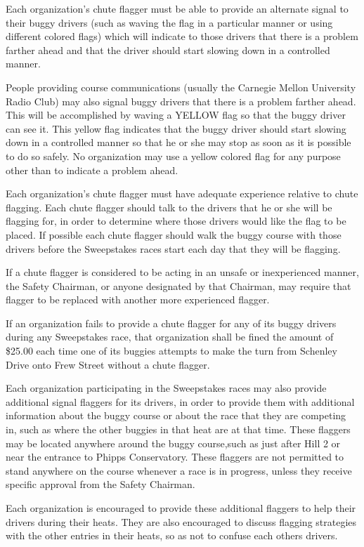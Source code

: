 \documentclass[openany]{book}
\begin{document}
Each organization's chute flagger must be able to provide an alternate signal to their buggy drivers (such as waving the flag in a particular manner or using different colored flags) which will indicate to those drivers that there is a problem farther ahead and that the driver should start slowing down in a controlled manner.

People providing course communications (usually the Carnegie Mellon University Radio Club) may also signal buggy drivers that there is a problem farther ahead. This will be accomplished by waving a YELLOW flag so that the buggy driver can see it. This yellow flag indicates that the buggy driver should start slowing down in a controlled manner so that he or she may stop as soon as it is possible to do so safely. No organization may use a yellow colored flag for any purpose other than to indicate a problem ahead.

Each organization's chute flagger must have adequate experience relative to chute flagging. Each chute flagger should talk to the drivers that he or she will be flagging for, in order to determine where those drivers would like the flag to be placed. If possible each chute flagger should walk the buggy course with those drivers before the Sweepstakes races start each day that they will be flagging.

If a chute flagger is considered to be acting in an unsafe or inexperienced manner, the Safety Chairman, or anyone designated by that Chairman, may require that flagger to be replaced with another more experienced flagger.

If an organization fails to provide a chute flagger for any of its buggy drivers during any Sweepstakes race, that organization shall be fined the amount of \$25.00 each time one of its buggies attempts to make the turn from Schenley Drive onto Frew Street without a chute flagger.

Each organization participating in the Sweepstakes races may also provide additional signal flaggers for its drivers, in order to provide them with additional information about the buggy course or about the race that they are competing in, such as where the other buggies in that heat are at that time. These flaggers may be located anywhere around the buggy course,such as just after Hill 2 or near the entrance to Phipps Conservatory. These flaggers are not permitted to stand anywhere on the course whenever a race is in progress, unless they receive specific approval from the Safety Chairman.

Each organization is encouraged to provide these additional flaggers to help their drivers during their heats. They are also encouraged to discuss flagging strategies with the other entries in their heats, so as not to confuse each others drivers.
\end{document}
